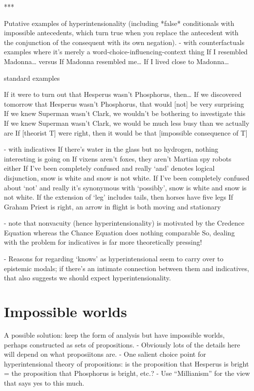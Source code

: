 \documentclass[If.tex]{subfiles}
\begin{document}
*** 






Putative examples of hyperintensionality 
	(including *false* conditionals with impossible antecedents, which turn true when you replace the antecedent with the conjunction of the consequent with its own negation).  
	- with counterfactuals
			examples where it's merely a word-choice-influencing-context thing
				If I resembled Madonna… versus If Madonna resembled me…
				If I lived close to Madonna…
			
			standard examples
			
			If it were to turn out that Hesperus wasn't Phosphorus, then…
			If we discovered tomorrow that Hesperus wasn't Phosphorus, that would [not] be very surprising
			If we knew Superman wasn't Clark, we wouldn't be bothering to investigate this
			If we knew Superman wasn't Clark, we would be much less busy than we actually are
			If [theorist T] were right, then it would be that [impossible consequence of T]
			
	- with indicatives
			If there's water in the glass but no hydrogen, nothing interesting is going on
			If vixens aren't foxes, they aren't Martian spy robots either
			If I've been completely confused and really ‘and’ denotes logical disjunction, snow is white and snow is not white.
			If I've been completely confused about ‘not’ and really it's synonymous with ‘possibly’, snow is white and snow is not white.
			If the extension of ‘leg’ includes tails, then horses have five legs
			If Graham Priest is right, an arrow in flight is both moving and stationary

	- note that nonvacuity (hence hyperintensionality) is motivated by the Credence Equation
		whereas the Chance Equation does nothing comparable
		So, dealing with the problem for indicatives is far more theoretically pressing!
		
	- Reasons for regarding ‘knows’ as hyperintensional seem to carry over to epistemic modals; if there's an intimate connection between them and indicatives, that also suggests we should expect hyperintensionality.  
	
\section{Impossible worlds}
A possible solution: keep the form of analysis but have impossible worlds, perhaps constructed as sets of propositions.  
	- Obviously lots of the details here will depend on what proposiitons are.
	- One salient choice point for hyperintensional theory of propositions: is the proposition that Hesperus is bright = the proposition that Phosphorus is bright, etc.?  
	- Use “Millianism” for the view that says yes to this much.  
\end{document}
